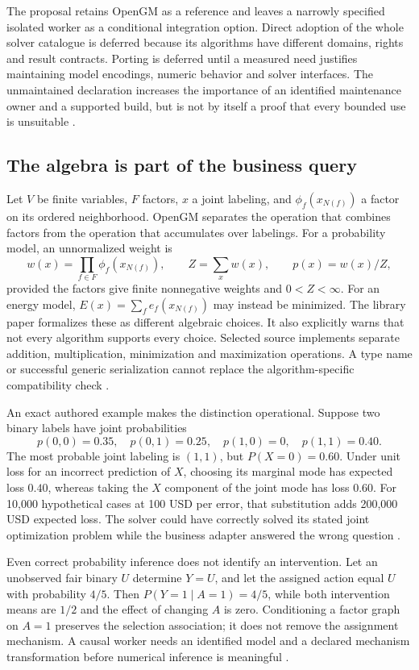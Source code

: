 The proposal retains OpenGM as a reference and leaves a narrowly specified
isolated worker as a conditional integration option. Direct adoption of the
whole solver catalogue is deferred because its algorithms have different
domains, rights and result contracts. Porting is deferred until a measured
need justifies maintaining model encodings, numeric behavior and solver
interfaces. The unmaintained declaration increases the importance of an
identified maintenance owner and a supported build, but is not by itself a
proof that every bounded use is unsuitable \citep{exec24_opengm_choice}.

\subsection{The algebra is part of the business query}
Let $V$ be finite variables, $F$ factors, $x$ a joint labeling, and
$\phi_f(x_{N(f)})$ a factor on its ordered neighborhood. OpenGM separates
the operation that combines factors from the operation that accumulates
over labelings. For a probability model, an unnormalized weight is
\[
 w(x)=\prod_{f\in F}\phi_f(x_{N(f)}),\qquad
 Z=\sum_x w(x),\qquad p(x)=w(x)/Z,
\]
provided the factors give finite nonnegative weights and $0<Z<\infty$.
For an energy model, $E(x)=\sum_f e_f(x_{N(f)})$ may instead be minimized.
The library paper formalizes these as different algebraic choices. It also
explicitly warns that not every algorithm supports every choice. Selected
source implements separate addition, multiplication, minimization and
maximization operations. A type name or successful generic serialization
cannot replace the algorithm-specific compatibility check
\citep{exec24_opengm_paper,exec24_opengm_source}.

An exact authored example makes the distinction operational. Suppose two
binary labels have joint probabilities
\[
 p(0,0)=0.35,\quad p(0,1)=0.25,\quad p(1,0)=0,\quad p(1,1)=0.40.
\]
The most probable joint labeling is $(1,1)$, but $P(X=0)=0.60$. Under
unit loss for an incorrect prediction of $X$, choosing its marginal mode
has expected loss $0.40$, whereas taking the $X$ component of the joint
mode has loss $0.60$. For 10,000 hypothetical cases at 100 USD per error,
that substitution adds 200,000 USD expected loss. The solver could have
correctly solved its stated joint optimization problem while the business
adapter answered the wrong question \citep{exec24_opengm_choice}.

Even correct probability inference does not identify an intervention.
Let an unobserved fair binary $U$ determine $Y=U$, and let the assigned
action equal $U$ with probability $4/5$. Then $P(Y=1\mid A=1)=4/5$, while
both intervention means are $1/2$ and the effect of changing $A$ is zero.
Conditioning a factor graph on $A=1$ preserves the selection association;
it does not remove the assignment mechanism. A causal worker needs an
identified model and a declared mechanism transformation before numerical
inference is meaningful \citep{exec24_opengm_choice}.

